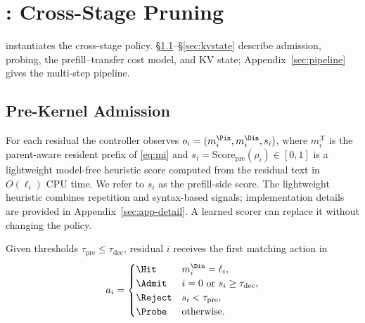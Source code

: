 \section{\sys: Cross-Stage Pruning}
\label{sec:design}

 instantiates the cross-stage policy.
\S\ref{sec:app}--\S\ref{sec:kvstate} describe admission, probing, the prefill--transfer cost model, and KV state; Appendix~\ref{sec:pipeline} gives the multi-step pipeline.

\subsection{Pre-Kernel Admission}
\label{sec:app}

For each residual the controller observes $o_i=(m_i^{\Pin},m_i^{\Din},s_i)$, where $m_i^{\mathcal{X}}$ is the parent-aware resident prefix of \eqref{eq:mi} and $s_i=\mathrm{Score}_{\mathrm{pre}}(\rho_i)\in[0,1]$ is a lightweight model-free heuristic score computed from the residual text in $O(\ell_i)$ CPU time.
We refer to $s_i$ as the prefill-side score.
The lightweight heuristic combines repetition and syntax-based signals; implementation details are provided in Appendix~\ref{sec:app-detail}.
A learned scorer can replace it without changing the policy.

\begin{definition}
\label{def:action}
Given thresholds $\tau_{\mathrm{pre}}\le\tau_{\mathrm{dec}}$, residual $i$ receives the first matching action in
\begin{equation}
\label{eq:action}
a_i=
\begin{cases}
\Hit & m_i^{\Din}=\ell_i,\\
\Admit & i=0\ \text{or}\ s_i\ge\tau_{\mathrm{dec}},\\
\Reject & s_i<\tau_{\mathrm{pre}},\\
\Probe & \text{otherwise}.
\end{cases}
\end{equation}
\end{definition}

